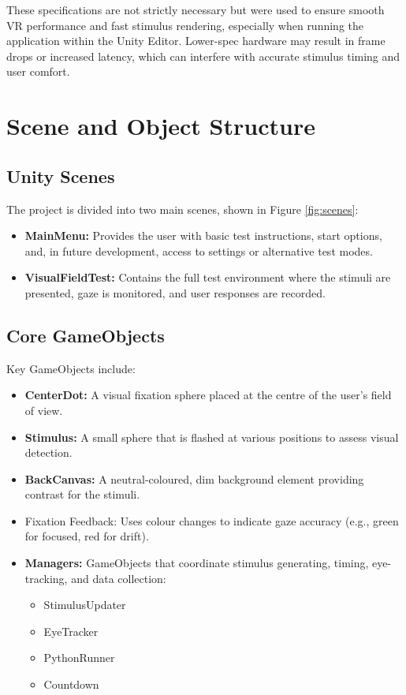 \documentclass{l4proj}
\begin{document}
These specifications are not strictly necessary but were used to ensure smooth VR performance and fast stimulus rendering, especially when running the application within the Unity Editor. Lower-spec hardware may result in frame drops or increased latency, which can interfere with accurate stimulus timing and user comfort.
 

\section{Scene and Object Structure}
\subsection{Unity Scenes}
The project is divided into two main scenes, shown in Figure \ref{fig:scenes}:

\begin{itemize}
    \item \textbf{MainMenu:} Provides the user with basic test instructions, start options, and, in future development, access to settings or alternative test modes.
 
    \item \textbf{VisualFieldTest:} Contains the full test environment where the stimuli are presented, gaze is monitored, and user responses are recorded.
\end{itemize}

\subsection{Core GameObjects}

Key GameObjects include:

\begin{itemize}
    \item \textbf{CenterDot:} A visual fixation sphere placed at the centre of the user’s field of view.
 
    \item \textbf{Stimulus:} A small sphere that is flashed at various positions to assess visual detection.
 
    \item \textbf{BackCanvas:} A neutral-coloured, dim background element providing contrast for the stimuli.
 
    \item Fixation Feedback: Uses colour changes to indicate gaze accuracy (e.g., green for focused, red for drift).
 
    \item \textbf{Managers:} GameObjects that coordinate stimulus generating, timing, eye-tracking, and data collection:
        \begin{itemize}
            \item StimulusUpdater
            \item EyeTracker
            \item PythonRunner
            \item Countdown
        \end{itemize}
    
\end{itemize}
\end{document}
